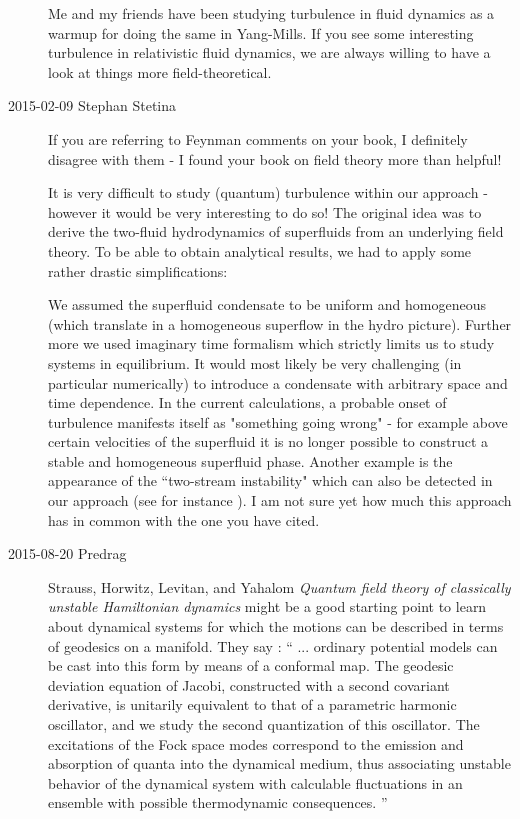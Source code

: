 \begin{description}
Me and my friends have been studying turbulence in fluid dynamics as a
warmup for doing the same in Yang-Mills. If you see some interesting
turbulence in relativistic fluid dynamics, we are always willing to have
a look at things more field-theoretical.



\item[2015-02-09 Stephan Stetina]
If you are referring to Feynman comments on your book, I definitely disagree
with them - I found your book on field theory more than helpful!

It is very difficult to study (quantum) turbulence within our approach -
however it would be very interesting to do so! The original idea was to
derive the two-fluid hydrodynamics of superfluids from an underlying
field theory. To be able to obtain analytical results, we had to apply
some rather drastic simplifications:

We assumed the superfluid condensate to be uniform and homogeneous (which
translate in a homogeneous superflow in the hydro picture). Further more
we used imaginary time formalism which strictly limits us to study
systems in equilibrium. It would most likely be very challenging (in
particular numerically) to introduce a condensate with arbitrary space
and time dependence. In the current calculations, a probable onset of
turbulence manifests itself as "something going wrong" - for example
above certain velocities of the superfluid it is no longer possible to
construct a stable and homogeneous superfluid phase. Another example is
the appearance of the ``two-stream instability" which can also be detected
in our approach (see for instance ).
I am not sure yet how much this approach has in common with the one you
have cited.

\item[2015-08-20 Predrag]
Strauss, Horwitz, Levitan, and Yahalom
{\em Quantum field theory of classically unstable {Hamiltonian} dynamics}
might be a good starting point to learn about dynamical systems for which
the motions can be described in terms of geodesics on a manifold. They
say : ``
... ordinary potential models can be cast into this form by means of a
conformal map. The geodesic deviation equation of Jacobi, constructed
with a second covariant derivative, is unitarily equivalent to that of a
parametric harmonic oscillator, and we study the second quantization of
this oscillator. The excitations of the Fock space modes correspond to
the emission and absorption of quanta into the dynamical medium, thus
associating unstable behavior of the dynamical system with calculable
fluctuations in an ensemble with possible thermodynamic consequences.
''


\end{description}
